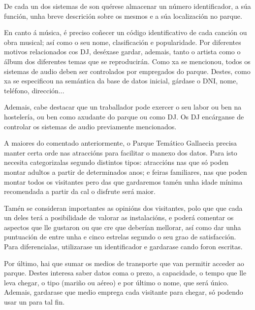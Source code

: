\documentclass[12pt,a4paper]{book}
\theoremstyle{definition}
\theoremstyle{break}
\begin{document}
	De cada un dos sistemas de son quérese almacenar un número identificador, a súa función, unha breve descrición sobre os mesmos e a súa localización no
	parque.
	
	En canto á música, é preciso coñecer un código identificativo de cada canción
	ou obra musical; así como o seu nome, clasificación e popularidade. Por diferentes motivos relacionados cos DJ, deséxase gardar, ademais, tanto o artista como o
	álbum dos diferentes temas que se reproducirán.
	Como xa se mencionou, todos os sistemas de audio deben ser controlados por empregados
	do parque. Destes, como xa se especificou na semántica da base de datos
	inicial, gárdase o DNI, nome, teléfono, dirección...
	
	Ademais, cabe destacar que un traballador pode exercer o seu labor ou ben na
	hostelería, ou ben como axudante do parque ou como DJ. Os DJ encárganse de controlar
	os sistemas de audio previamente mencionados.
	
	A maiores do comentado anteriormente, o Parque Temático {\logo Gallaecia} precisa
	manter certa orde nas atraccións para facilitar o manexo dos datos. Para isto necesita categorizalas segundo distintos tipos: atraccións nas que só poden montar adultos a partir de determinados anos; e feiras familiares, nas que poden montar todos os visitantes pero das
	que gardaremos tamén unha idade mínima recomendada a partir da cal o disfrute
	será maior.
	
	Tamén se consideran importantes as opinións dos visitantes, polo que que cada un deles terá a posibilidade de valorar as instalacións, e poderá comentar os aspectos que lle gustaron ou que cre que deberían mellorar, así como dar unha puntuación de entre unha e cinco estrelas segundo o seu grao de satisfacción. Para diferencialas, utilizarase un identificador e gardarase cando foron escritas.
	
	Por último, hai que sumar os medios de transporte que van permitir acceder ao parque. Destes interesa saber datos coma o prezo, a capacidade, o tempo que lle leva chegar, o tipo (mariño ou aéreo) e por último o nome, que será único.
	Ademais, gardarase que medio emprega cada visitante para chegar, só podendo
	usar un para tal fin.
	
\end{document}
